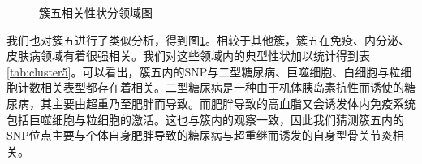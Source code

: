 \begin{figure}[htbp]
	\centering
	\caption{簇五相关性状分领域图}
	\label{fig:cluster5}
\end{figure}

我们也对簇五进行了类似分析，得到图\ref{fig:cluster5}。相较于其他簇，簇五在免疫、内分泌、皮肤病领域有着很强相关。我们对这些领域内的典型性状加以统计得到表\ref{tab:cluster5}。可以看出，簇五内的SNP与二型糖尿病、巨噬细胞、白细胞与粒细胞计数相关表型都存在着相关。二型糖尿病是一种由于机体胰岛素抗性而诱使的糖尿病，其主要由超重乃至肥胖而导致\cite{maruthur_diabetes_2016}。而肥胖导致的高血脂又会诱发体内免疫系统包括巨噬细胞与粒细胞的激活\cite{barrett_diabetes-mediated_2017}。这也与簇内的观察一致，因此我们猜测簇五内的SNP位点主要与个体自身肥胖导致的糖尿病与超重继而诱发的自身型骨关节炎相关。

